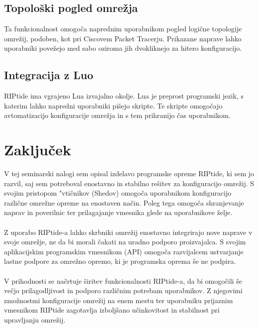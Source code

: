 \documentclass[12pt]{article}
\begin{document}
\subsection{Topološki pogled omrežja}
Ta funkcionalnost omogoča naprednim uporabnikom pogled logične topologije
omrežij, podoben, kot pri Ciscovem Packet Tracerju. Prikazane naprave
lahko uporabniki povežejo med sabo oziroma jih dvokliknejo za hitero
konfiguracijo.

\subsection{Integracija z Luo}
RIPtide ima vgrajeno Lua izvajalno okolje. Lua je preprost programski jezik,
s katerim lahko napredni uporabniki pišejo skripte. Te skripte omogočajo
avtomatizacijo konfiguracije omrežja in s tem prihranijo čas uporabnikom.
\newpage

\section{Zaključek}
V tej seminarski nalogi sem opisal izdelavo programske opreme RIPtide, ki
sem jo razvil, saj sem potreboval enostavno in stabilno rešitev za
konfiguracijo omrežij. S svojim pristopom "vtičnikov (Shedov) omogoča
uporabnikom konfiguracijo različne omrežne opreme na enostaven način.
Poleg tega omogoča shranjevanje naprav in poverilnic ter prilagajanje
vmesnika glede na uporabnikove želje.
\\\\
Z uporabo RIPtide-a lahko skrbniki omrežij enostavno integrirajo nove
naprave v svoje omrežje, ne da bi morali čakati na uradno podporo
proizvajalca. S svojim aplikacijskim programskim vmesnikom (API) omogoča
razvijalcem ustvarjanje lastne podpore za omrežno opremo, ki je programska
oprema še ne podpira.
\\\\
V prihodnosti se načrtuje širitev funkcionalnosti RIPtide-a, da bi
omogočili še večjo prilagodljivost in podporo različnim potrebam
uporabnikov. Z njegovimi zmožnostmi konfiguracije omrežij na enem mestu ter
uporabniku prijaznim vmesnikom RIPtide zagotavlja izboljšano učinkovitost
in stabilnost pri upravljanju omrežij.
\newpage
\end{document}
